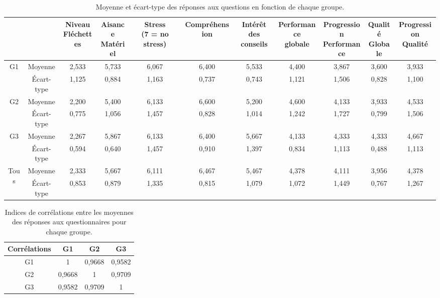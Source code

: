 \begin{table}[h]
\centering
\begin{adjustbox}{max width=\textwidth}
\begin{tabular}{c|c|c|c|c|c|c|c|c|c|c}
 &  & \makecell[l]{Niveau\\Fléchettes} & \makecell[l]{Aisance\\Matériel} & \makecell[l]{Stress\\(7 = no stress)} & Compréhension & \makecell[l]{Intérêt\\des conseils} & \makecell[l]{Performance\\globale} & \makecell[l]{Progression\\Performance} & \makecell[l]{Qualité\\Globale} & \makecell[l]{Progression\\Qualité} \\ \hline
\multirow{2}{*}{G1} & Moyenne & 2,533 & 5,733 & 6,067 & 6,400 & 5,533 & 4,400 & 3,867 & 3,600 & 3,933 \\
 & Écart-type & 1,125 & 0,884 & 1,163 & 0,737 & 0,743 & 1,121 & 1,506 & 0,828 & 1,100 \\ \hline
\multirow{2}{*}{G2} & Moyenne & 2,200 & 5,400 & 6,133 & 6,600 & 5,200 & 4,600 & 4,133 & 3,933 & 4,533 \\
 & Écart-type & 0,775 & 1,056 & 1,457 & 0,828 & 1,014 & 1,242 & 1,727 & 0,799 & 1,506 \\ \hline
\multirow{2}{*}{G3} & Moyenne & 2,267 & 5,867 & 6,133 & 6,400 & 5,667 & 4,133 & 4,333 & 4,333 & 4,667 \\
 & Écart-type & 0,594 & 0,640 & 1,457 & 0,910 & 1,397 & 0,834 & 1,113 & 0,488 & 1,113 \\ \hline
\multirow{2}{*}{Tous} & Moyenne & 2,333 & 5,667 & 6,111 & 6,467 & 5,467 & 4,378 & 4,111 & 3,956 & 4,378 \\
 & Écart-type & 0,853 & 0,879 & 1,335 & 0,815 & 1,079 & 1,072 & 1,449 & 0,767 & 1,267
\end{tabular}
\end{adjustbox}
\caption{Moyenne et écart-type des réponses aux questions en fonction de chaque groupe.}
\label{darts_tab_survey}
\end{table}



\begin{table}[h]
\centering
\begin{tabular}{c|c|c|c}
Corrélations & G1 & G2 & G3 \\ \hline
G1 & 1 & 0,9668 & 0,9582 \\ \hline
G2 & 0,9668 & 1 & 0,9709 \\ \hline
G3 & 0,9582 & 0,9709 & 1
\end{tabular}
\caption{Indices de corrélations entre les moyennes des réponses aux questionnaires pour chaque groupe.}
\label{darts_tab_survey_correlation}
\end{table}

